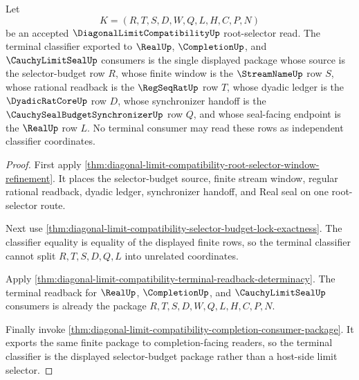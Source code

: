 \begin{theorem}
\label{thm:diagonal-limit-compatibility-selector-budget-terminal-classifier}
Let
$$
K=(R,T,S,D,W,Q,L,H,C,P,N)
$$
be an accepted $\DiagonalLimitCompatibilityUp$ root-selector read. The terminal classifier exported to $\RealUp$, $\CompletionUp$, and $\CauchyLimitSealUp$ consumers is the single displayed package whose source is the selector-budget row $R$, whose finite window is the $\StreamNameUp$ row $S$, whose rational readback is the $\RegSeqRatUp$ row $T$, whose dyadic ledger is the $\DyadicRatCoreUp$ row $D$, whose synchronizer handoff is the $\CauchySealBudgetSynchronizerUp$ row $Q$, and whose seal-facing endpoint is the $\RealUp$ row $L$. No terminal consumer may read these rows as independent classifier coordinates.
\end{theorem}
\begin{proof}
First apply \autoref{thm:diagonal-limit-compatibility-root-selector-window-refinement}. It places the selector-budget source, finite stream window, regular rational readback, dyadic ledger, synchronizer handoff, and Real seal on one root-selector route.

Next use \autoref{thm:diagonal-limit-compatibility-selector-budget-lock-exactness}. The classifier equality is equality of the displayed finite rows, so the terminal classifier cannot split $R,T,S,D,Q,L$ into unrelated coordinates.

Apply \autoref{thm:diagonal-limit-compatibility-terminal-readback-determinacy}. The terminal readback for $\RealUp$, $\CompletionUp$, and $\CauchyLimitSealUp$ consumers is already the package $R,T,S,D,W,Q,L,H,C,P,N$.

Finally invoke \autoref{thm:diagonal-limit-compatibility-completion-consumer-package}. It exports the same finite package to completion-facing readers, so the terminal classifier is the displayed selector-budget package rather than a host-side limit selector.
\end{proof}

